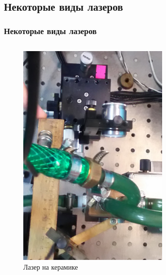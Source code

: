 \documentclass[10pt,pdf,hyperref={unicode}, dvipsnames]{beamer}
\newcommand\frametitless[1]{\subsection{#1}\frametitle{#1}}
\begin{document}
\begin{frame}[t]
	\frametitless{Некоторые виды лазеров}
	\vspace{-1em}

	\begin{columns}
		\begin{column}{0.3\textwidth}
			\begin{figure}[h]
				\centering
				\includegraphics[width=0.8\textwidth]{photo/las_s}
				\caption{Лазер на керамике}
			\end{figure}	
		\end{column}
		\begin{column}{0.3\textwidth}
			\begin{figure}[h]
				\centering

\end{figure}
\end{column}
\end{columns}
\end{frame}
\end{document}
